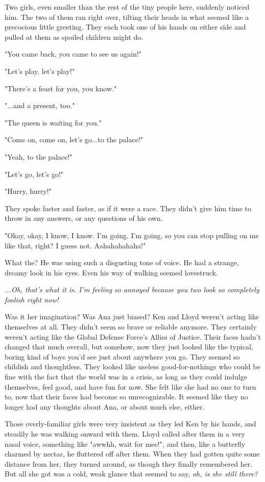 \documentclass[
]{article}
\begin{document}
Two girls, even smaller than the rest of the tiny people here, suddenly
noticed him. The two of them ran right over, tilting their heads in what
seemed like a precocious little greeting. They each took one of his
hands on either side and pulled at them as spoiled children might do.

"You came back, you came to see us again!"

"Let's play, let's play!"

"There's a feast for you, you know."

"...and a present, too."

"The queen is waiting for you."

"Come on, come on, let's go...to the palace!"

"Yeah, to the palace!"

"Let's go, let's go!"

"Hurry, hurry!"

They spoke faster and faster, as if it were a race. They didn't give him
time to throw in any answers, or any questions of his own.

"Okay, okay, I know, I know. I'm going. I'm going, so you can stop
pulling on me like that, right? I guess not. Aahahahahaha!"

What the? He was using such a disgusting tone of voice. He had a
strange, dreamy look in his eyes. Even his way of walking seemed
lovestruck.

\emph{...Oh, that's what it is. I'm feeling so annoyed because you two
look so completely foolish right now!}

Was it her imagination? Was Ana just biased? Ken and Lloyd weren't
acting like themselves at all. They didn't seem so brave or reliable
anymore. They certainly weren't acting like the Global Defense Force's
Allies of Justice. Their faces hadn't changed that much overall, but
somehow, now they just looked like the typical, boring kind of boys
you'd see just about anywhere you go. They seemed so childish and
thoughtless. They looked like useless good-for-nothings who could be
fine with the fact that the world was in a crisis, as long as they could
indulge themselves, feel good, and have fun for now. She felt like she
had no one to turn to, now that their faces had become so
unrecognizable. It seemed like they no longer had any thoughts about
Ana, or about much else, either.

Those overly-familiar girls were very insistent as they led Ken by his
hands, and steadily he was walking onward with them. Lloyd called after
them in a very nasal voice, something like "awwhh, wait for mee!", and
then, like a butterfly charmed by nectar, he fluttered off after them.
When they had gotten quite some distance from her, they turned around,
as though they finally remembered her. But all she got was a cold, weak
glance that seemed to say, \emph{oh, is she still there?}
\end{document}
